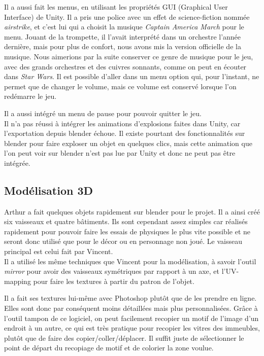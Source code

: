 \documentclass[10pt, titlepage]{report}
\begin{document}
 Il a aussi fait les menus, en utilisant les propriétés GUI (Graphical User Interface) de Unity. Il a pris une police avec un effet de science-fiction nommée \textit{airstrike}, et c'est lui qui a choisit la musique \textit{Captain America March} pour le menu. Jouant de la trompette, il l'avait interprété dans un orchestre l'année dernière, mais pour plus de confort, nous avons mis la version officielle de la musique. Nous aimerions par la suite conserver ce genre de musique pour le jeu, avec des grands orchestres et des cuivres sonnants, comme on peut en écouter dans \textit{Star Wars}. Il est possible d'aller dans un menu option qui, pour l'instant, ne permet que de changer le volume, mais ce volume est conservé lorsque l'on redémarre le jeu.

Il a aussi intégré un menu de pause pour pouvoir quitter le jeu.\\

Il n'a pas réussi à intégrer les animations d'explosions faites dans Unity, car l'exportation depuis blender échoue. Il existe pourtant des fonctionnalités sur blender pour faire exploser un objet en quelques clics, mais cette animation que l'on peut voir sur blender n'est pas lue par Unity et donc ne peut pas être intégrée.

\subsection{Modélisation 3D}

Arthur a fait quelques objets rapidement sur blender pour le projet. Il a ainsi créé six vaisseaux et quatre bâtiments. Ils sont cependant assez simples car réalisés rapidement pour pouvoir faire les essais de physiques le plus vite possible et ne seront donc utilisé que pour le décor ou en personnage non joué. Le vaisseau principal est celui fait par Vincent.\\

Il a utilisé les même techniques que Vincent pour la modélisation, à savoir l'outil \textit{mirror} pour avoir des vaisseaux symétriques par rapport à un axe, et  l'UV-mapping pour faire les textures à partir du patron de l'objet.

Il a fait ses textures lui-même avec Photoshop plutôt que de les prendre en ligne. Elles sont donc par conséquent moins détaillées mais plus personnalisées. Grâce à l'outil tampon de ce logiciel, on peut facilement recopier un motif de l'image d'un endroit à un autre, ce qui est très pratique pour recopier les vitres des immeubles, plutôt que de faire des copier/coller/déplacer. Il suffit juste de sélectionner le point de départ du recopiage de motif et de colorier la zone voulue.
\end{document}
